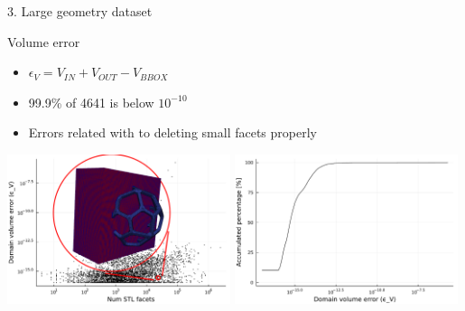 \documentclass{beamer}
\begin{document}
\begin{frame}{3. Large geometry dataset}

  \begin{block}{Volume error}
  \begin{itemize}
    \item
      $\epsilon_V = V_{IN} + V_{OUT} - V_{BBOX}$
    \item
      99.9\% of 4641 is below $10^{-10}$
    \item
      Errors related with to deleting small facets properly
  \end{itemize}
  \end{block}

  \includegraphics[width=0.49\textwidth]{num_stl_facets_volume_error_509317}
  \includegraphics[width=0.49\textwidth]{../analysis/plots/histogram_volume_error}
\end{frame}

%
%
\end{document}
